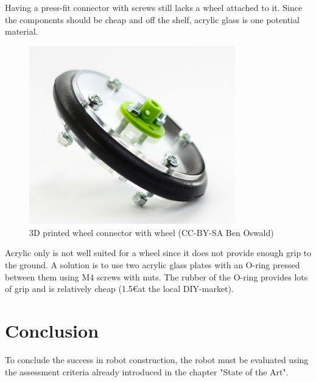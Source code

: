 Having a press-fit connector with screws still lacks a wheel attached to it. Since the components should be cheap and off the shelf, acrylic glass is one potential material.

\begin{figure}[H]
  \centering
  \includegraphics[width=0.8\textwidth]{images/30_wheel_full.jpg}
  \caption{3D printed wheel connector with wheel (CC-BY-SA Ben Oswald)}
\end{figure}

Acrylic only is not well suited for a wheel since it does not provide enough grip to the ground. A solution is to use two acrylic glass plates with an O-ring pressed between them using M4 screws with nuts. The rubber of the O-ring provides lots of grip and is relatively cheap (1.5\euro at the local DIY-market).

\chapter{Conclusion}
To conclude the success in robot construction, the robot must be evaluated using the assessment criteria already introduced in the chapter "State of the Art". 

